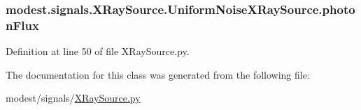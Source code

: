 \subsubsection[{\texorpdfstring{photon\+Flux}{photonFlux}}]{\setlength{\rightskip}{0pt plus 5cm}modest.\+signals.\+X\+Ray\+Source.\+Uniform\+Noise\+X\+Ray\+Source.\+photon\+Flux}\hypertarget{classmodest_1_1signals_1_1XRaySource_1_1UniformNoiseXRaySource_a30ee9fa8b5c01796c79d6accb1932d77}{}\label{classmodest_1_1signals_1_1XRaySource_1_1UniformNoiseXRaySource_a30ee9fa8b5c01796c79d6accb1932d77}


Definition at line 50 of file X\+Ray\+Source.\+py.



The documentation for this class was generated from the following file\+:\begin{DoxyCompactItemize}
\item 
modest/signals/\hyperlink{XRaySource_8py}{X\+Ray\+Source.\+py}\end{DoxyCompactItemize}
